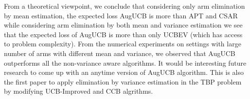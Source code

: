 From a theoretical viewpoint, we conclude that considering only arm elimination by mean estimation, the expected loss AugUCB is more than APT and CSAR while considering arm elimination by both mean and variance estimation we see that the expected loss of AugUCB is more than only UCBEV (which has access to problem complexity). From the numerical experiments on settings with large number of arms with different mean and variance, we observed that AugUCB outperforms all the non-variance aware algorithms. It would be interesting future research to come up with an anytime version of AugUCB algorithm. This is also the first paper to apply elimination by variance estimation in the TBP problem by modifying UCB-Improved and CCB algrithms. 